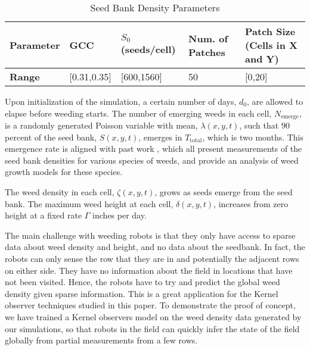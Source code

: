 \begin{table}[h]
	\centering
	\caption{Seed Bank Density Parameters} \label{tab:weedparams} 
	\begin{center}
		\begin{tabular}{ | l | l | l | l | l |}
			\hline
			\textbf{Parameter} & GCC         & $S_0$ (seeds/cell)       & Num. of Patches & Patch Size (Cells in X and Y)  \\ \hline
			\textbf{Range}     & [0.31,0.35] & [600,1560] & 50  & [0,20]  \\ \hline
		\end{tabular}
	\end{center}
\end{table}


Upon initialization of the simulation, a certain number of days, $d_0$, are allowed to elapse before weeding starts. The number of emerging weeds in each cell, $N_{{\text{emerge}}}$, is a randomly generated Poisson variable with mean, $\lambda \left( {x,y,t} \right) $, such that $90$ percent of the seed bank, $S\left( {x,y,t} \right)$, emerges in $T_\text{total}$, which is two months. This emergence rate is aligned with past work \cite{Nordby2018,schutte2014common, werle2014predicting, sellers2003comparative, horak2000growth},  which all present measurements of the seed bank densities for various species of weeds, and provide an analysis of weed growth models for these species.

The weed density in each cell, $\zeta \left( {x,y,t} \right) $, grows as seeds emerge from the seed bank. The maximum weed height at each cell, $\delta \left( {x,y,t} \right)$, increases from zero height at a fixed rate $\Gamma$ inches per day.

The main challenge with weeding robots is that they only have access to sparse data about weed density and height, and no data about the seedbank. In fact, the robots can only sense the row that they are in and potentially the adjacent rows on either side. They have no information about the field in locations that have not been visited. Hence, the robots have to try and predict the global weed density given sparse information. This is a great application for the Kernel observer techniques studied in this paper. To demonstrate the proof of concept, we have trained a Kernel observers model on the weed density data generated by our simulations, so that robots in the field can quickly infer the state of the field globally from partial measurements from a few rows.

